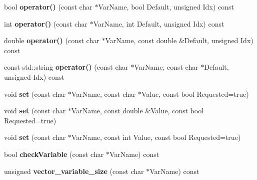 \begin{DoxyCompactItemize}
\item 
\hypertarget{classGetPot_a17489588d77437b4e8b6d6b002a8898d}{
bool {\bfseries operator()} (const char $\ast$VarName, bool Default, unsigned Idx) const }
\label{classGetPot_a17489588d77437b4e8b6d6b002a8898d}

\item 
\hypertarget{classGetPot_a403ee188f1ba0447569cd982cb9dcc44}{
int {\bfseries operator()} (const char $\ast$VarName, int Default, unsigned Idx) const }
\label{classGetPot_a403ee188f1ba0447569cd982cb9dcc44}

\item 
\hypertarget{classGetPot_aa269bc0f2f7b3ea56b56aec8054d2f98}{
double {\bfseries operator()} (const char $\ast$VarName, const double \&Default, unsigned Idx) const }
\label{classGetPot_aa269bc0f2f7b3ea56b56aec8054d2f98}

\item 
\hypertarget{classGetPot_ad7781191cffcf56db83267ed29eb2204}{
const std::string {\bfseries operator()} (const char $\ast$VarName, const char $\ast$Default, unsigned Idx) const }
\label{classGetPot_ad7781191cffcf56db83267ed29eb2204}

\item 
\hypertarget{classGetPot_a389eb9b67c5ff84394c648932b1d717f}{
void {\bfseries set} (const char $\ast$VarName, const char $\ast$Value, const bool Requested=true)}
\label{classGetPot_a389eb9b67c5ff84394c648932b1d717f}

\item 
\hypertarget{classGetPot_a9d9386ce9c4538015b0c8b6e8fda52ee}{
void {\bfseries set} (const char $\ast$VarName, const double \&Value, const bool Requested=true)}
\label{classGetPot_a9d9386ce9c4538015b0c8b6e8fda52ee}

\item 
\hypertarget{classGetPot_a6f5c03e5370a9f4ea7216fdfcec576b1}{
void {\bfseries set} (const char $\ast$VarName, const int Value, const bool Requested=true)}
\label{classGetPot_a6f5c03e5370a9f4ea7216fdfcec576b1}

\item 
\hypertarget{classGetPot_acebb6f432d3749c950ae732eb9fa7b21}{
bool {\bfseries checkVariable} (const char $\ast$VarName) const }
\label{classGetPot_acebb6f432d3749c950ae732eb9fa7b21}

\item 
\hypertarget{classGetPot_ac58129dc7b1cccfa45a7175f33c8d6c3}{
unsigned {\bfseries vector\_\-variable\_\-size} (const char $\ast$VarName) const }
\label{classGetPot_ac58129dc7b1cccfa45a7175f33c8d6c3}


\end{DoxyCompactItemize}
